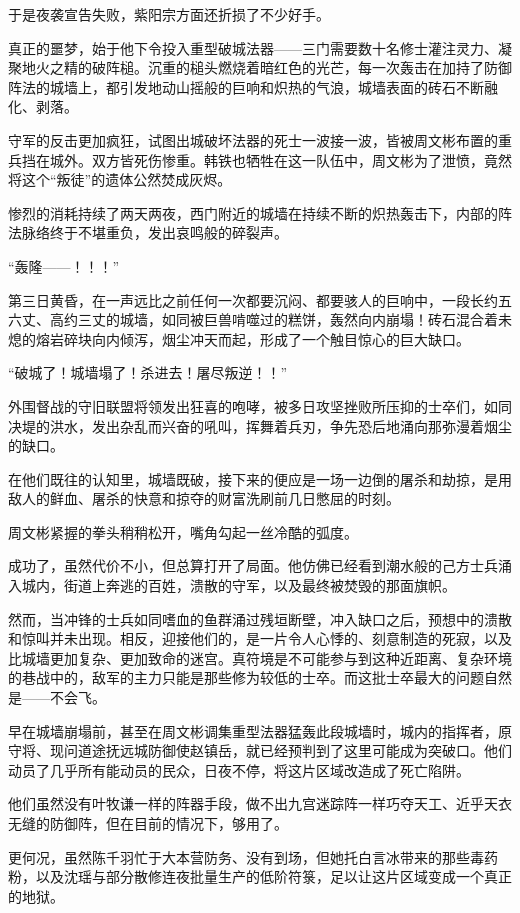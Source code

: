 于是夜袭宣告失败，紫阳宗方面还折损了不少好手。

真正的噩梦，始于他下令投入重型破城法器——三门需要数十名修士灌注灵力、凝聚地火之精的破阵槌。沉重的槌头燃烧着暗红色的光芒，每一次轰击在加持了防御阵法的城墙上，都引发地动山摇般的巨响和炽热的气浪，城墙表面的砖石不断融化、剥落。

守军的反击更加疯狂，试图出城破坏法器的死士一波接一波，皆被周文彬布置的重兵挡在城外。双方皆死伤惨重。韩铁也牺牲在这一队伍中，周文彬为了泄愤，竟然将这个“叛徒”的遗体公然焚成灰烬。

惨烈的消耗持续了两天两夜，西门附近的城墙在持续不断的炽热轰击下，内部的阵法脉络终于不堪重负，发出哀鸣般的碎裂声。

“轰隆——！！！”

第三日黄昏，在一声远比之前任何一次都要沉闷、都要骇人的巨响中，一段长约五六丈、高约三丈的城墙，如同被巨兽啃噬过的糕饼，轰然向内崩塌！砖石混合着未熄的熔岩碎块向内倾泻，烟尘冲天而起，形成了一个触目惊心的巨大缺口。

“破城了！城墙塌了！杀进去！屠尽叛逆！！”

外围督战的守旧联盟将领发出狂喜的咆哮，被多日攻坚挫败所压抑的士卒们，如同决堤的洪水，发出杂乱而兴奋的吼叫，挥舞着兵刃，争先恐后地涌向那弥漫着烟尘的缺口。

在他们既往的认知里，城墙既破，接下来的便应是一场一边倒的屠杀和劫掠，是用敌人的鲜血、屠杀的快意和掠夺的财富洗刷前几日憋屈的时刻。

周文彬紧握的拳头稍稍松开，嘴角勾起一丝冷酷的弧度。

成功了，虽然代价不小，但总算打开了局面。他仿佛已经看到潮水般的己方士兵涌入城内，街道上奔逃的百姓，溃散的守军，以及最终被焚毁的那面旗帜。

\vspace{2em}

然而，当冲锋的士兵如同嗜血的鱼群涌过残垣断壁，冲入缺口之后，预想中的溃散和惊叫并未出现。相反，迎接他们的，是一片令人心悸的、刻意制造的死寂，以及比城墙更加复杂、更加致命的迷宫。真符境是不可能参与到这种近距离、复杂环境的巷战中的，敌军的主力只能是那些修为较低的士卒。而这批士卒最大的问题自然是——不会飞。

早在城墙崩塌前，甚至在周文彬调集重型法器猛轰此段城墙时，城内的指挥者，原守将、现问道途抚远城防御使赵镇岳，就已经预判到了这里可能成为突破口。他们动员了几乎所有能动员的民众，日夜不停，将这片区域改造成了死亡陷阱。

他们虽然没有叶牧谦一样的阵器手段，做不出九宫迷踪阵一样巧夺天工、近乎天衣无缝的防御阵，但在目前的情况下，够用了。

更何况，虽然陈千羽忙于大本营防务、没有到场，但她托白言冰带来的那些毒药粉，以及沈瑶与部分散修连夜批量生产的低阶符箓，足以让这片区域变成一个真正的地狱。

